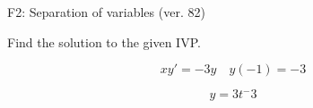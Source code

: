 \begin{exercise}
  \begin{exerciseTitle}F2: Separation of variables (ver. 82)\end{exerciseTitle}
  \begin{exerciseStatement}
    
Find the solution to the given IVP.

    
\[xy'= -3 y \hspace{1em} y( -1 ) = -3\]

  \end{exerciseStatement}
  \begin{exerciseAnswer}
    
\[y= 3 t^ -3\]

  \end{exerciseAnswer}
\end{exercise}